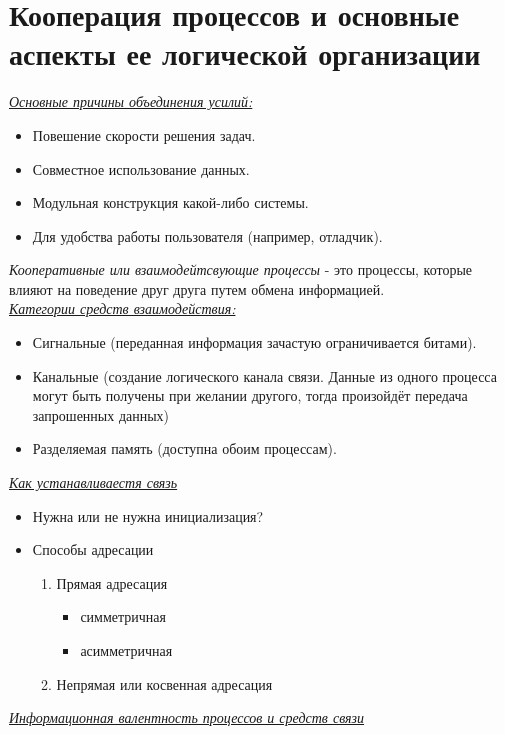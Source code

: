 \documentclass[12pt, a4paper]{article}
\begin{document}
    \section{Кооперация процессов и основные аспекты ее логической организации}
    \underline{\textit{Основные причины объединения усилий:}}
    \begin{itemize}
        \item Повешение скорости решения задач.
        \item Совместное использование данных.
        \item Модульная конструкция какой-либо системы.
        \item Для удобства работы пользователя (например, отладчик).
    \end{itemize}
    \textit{Кооперативные или взаимодейтсвующие процессы} - это процессы, которые влияют на поведение друг друга путем обмена информацией.\\
    \underline{\textit{Категории средств взаимодействия:}}
    \begin{itemize}
        \item Сигнальные (переданная информация зачастую ограничивается битами).
        \item Канальные (создание логического канала связи. Данные из одного процесса могут быть получены при желании другого, тогда произойдёт передача запрошенных данных)
        \item Разделяемая память (доступна обоим процессам).
    \end{itemize}
    \underline{\textit{Как устанавливаестя связь}}
    \begin{itemize}
        \item Нужна или не нужна инициализация?
        \item Способы адресации
        \begin{enumerate}
            \item Прямая адресация
            \begin{itemize}
                \item симметричная
                \item асимметричная
            \end{itemize}
            \item Непрямая или косвенная адресация
        \end{enumerate}
    \end{itemize}
    \underline{\textit{Информационная валентность процессов и средств связи}}
\end{document}
